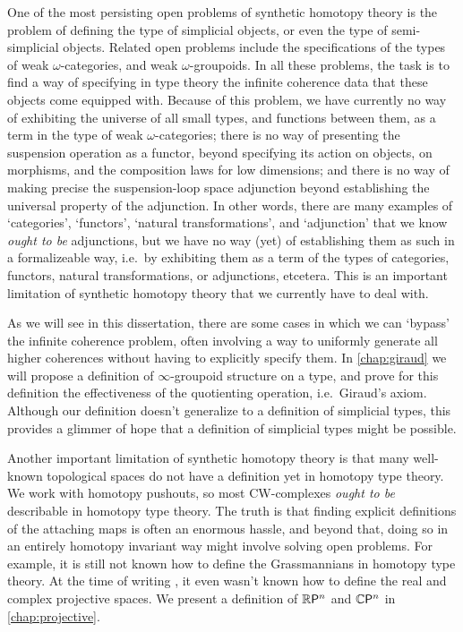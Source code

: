 One of the most persisting open problems of synthetic homotopy theory is the problem of defining the type of simplicial objects, or even the type of semi-simplicial objects. Related open problems include the specifications of the types of weak $\omega$-categories, and weak $\omega$-groupoids. In all these problems, the task is to find a way of specifying in type theory the infinite coherence data that these objects come equipped with. Because of this problem, we have currently no way of exhibiting the universe of all small types, and functions between them, as a term in the type of weak $\omega$-categories; there is no way of presenting the suspension operation as a functor, beyond specifying its action on objects, on morphisms, and the composition laws for low dimensions; and there is no way of making precise the suspension-loop space adjunction beyond establishing the universal property of the adjunction. In other words, there are many examples of `categories', `functors', `natural transformations', and `adjunction' that we know \emph{ought to be} adjunctions, but we have no way (yet) of establishing them as such in a formalizeable way, i.e.~by exhibiting them as a term of the types of categories, functors, natural transformations, or adjunctions, etcetera. This is an important limitation of synthetic homotopy theory that we currently have to deal with.

As we will see in this dissertation, there are some cases in which we can `bypass' the infinite coherence problem, often involving a way to uniformly generate all higher coherences without having to explicitly specify them. In \cref{chap:giraud} we will propose a definition of $\infty$-groupoid structure on a type, and prove for this definition the effectiveness of the quotienting operation, i.e.~Giraud's axiom. Although our definition doesn't generalize to a definition of simplicial types, this provides a glimmer of hope that a definition of simplicial types might be possible.

Another important limitation of synthetic homotopy theory is that many well-known topological spaces do not have a definition yet in homotopy type theory. We work with homotopy pushouts, so most CW-complexes \emph{ought to be} describable in homotopy type theory. The truth is that finding explicit definitions of the attaching maps is often an enormous hassle, and beyond that, doing so in an entirely homotopy invariant way might involve solving open problems. For example, it is still not known how to define the Grassmannians in homotopy type theory. At the time of writing \cite{hottbook}, it even wasn't known how to define the real and complex projective spaces. We present a definition of $\mathbb{R}\mathsf{P}^{n}$ and $\mathbb{C}\mathsf{P}^{n}$ in \cref{chap:projective}.

